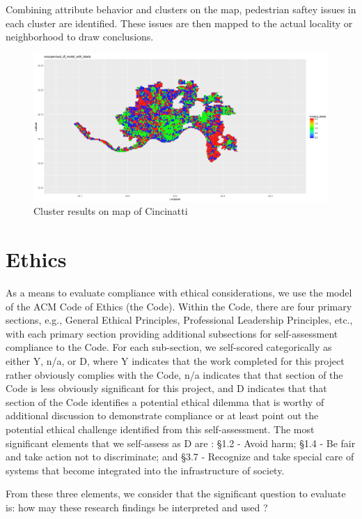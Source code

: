\documentclass{llncs}
\begin{document}
Combining attribute behavior and clusters on the map, pedestrian saftey issues in each cluster are identified. These issues are then mapped to the actual locality or neighborhood to draw conclusions.

\FloatBarrier
\begin{figure}
 	\includegraphics[width=\textwidth, height=\textheight, keepaspectratio]{kmeansongrid.png}
 	\caption{Cluster results on map of Cincinatti}
	\label{figure:kmeansongrid}
\end{figure}
\FloatBarrier

%
\section{Ethics}
%
As a means to evaluate compliance with ethical considerations, we use the model of the ACM Code of Ethics  (the Code). Within the Code, there are four primary sections, e.g., General Ethical Principles, Professional Leadership Principles, etc., with each primary section providing additional subsections for self-assessment compliance to the Code. For each sub-section, we self-scored categorically as either Y, n/a, or D, where Y indicates that the work completed for this project rather obviously complies with the Code, n/a indicates that that section of the Code is less obviously significant for this project, and D indicates that that section of the Code identifies a potential ethical dilemma that is worthy of additional discussion to demonstrate compliance or at least point out the potential ethical challenge identified from this self-assessment.
The most significant elements that we self-assess as D are : \S 1.2 - Avoid harm; \S 1.4 - Be fair and take action not to discriminate; and \S 3.7 - Recognize and take special care of systems that become integrated into the infrastructure of society.

From these three elements, we consider that the significant question to evaluate is: how may these research findings be interpreted and used ?
\end{document}
